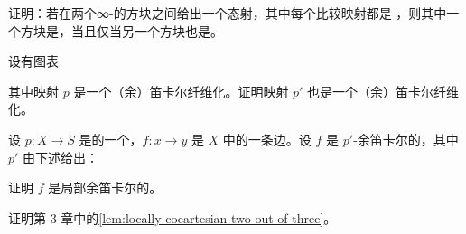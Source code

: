 \begin{exercise}\label{ex:homotopy-cartesian-square-invariant}
证明：若在两个∞-\trCategories{}的方块之间给出一个态射，其中每个比较映射都是%
\trJoyalEquivalence{}，则其中一个方块是\trHomotopyCartesian{}，当且仅当另一个方块也是。
\end{exercise}

\begin{exercise}\label{ex:pullback-cartesian-fibration}
设有\trPullback{}图表
\begin{center}
\end{center}
其中映射 $p$ 是一个（余）笛卡尔纤维化。证明映射 $p'$ 也是一个（余）笛卡尔纤维化。
\end{exercise}

\begin{exercise}\label{ex:p-prime-cocartesian-locally-cocartesian}
设 $p\colon X \to S$ 是\trSimplicialSet{}的一个\trInnerFibration{}，$f\colon x \to y$
是 $X$ 中的一条边。设 $f$ 是 $p'$-余笛卡尔的，其中 $p'$ 由下述\trPullback{}给出：
\begin{center}
\end{center}
证明 $f$ 是局部余笛卡尔的。
\end{exercise}

\begin{exercise}\label{ex:prove-lemma-3-2-7}
证明第 3 章中的\cref{lem:locally-cocartesian-two-out-of-three}。
\end{exercise}

